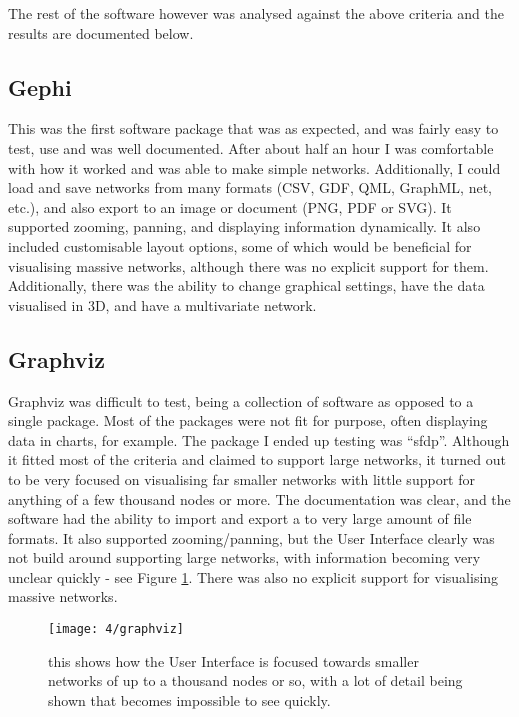 \documentclass[../dissertation.tex]{subfiles}
\begin{document}
The rest of the software however was analysed against the above criteria and the results are documented below.

\subsection{Gephi}

This was the first software package that was as expected, and was fairly easy to test, use and was well documented. After about half an hour I was comfortable with how it worked and was able to make simple networks. Additionally, I could load and save networks from many formats (CSV, GDF, QML, GraphML, net, etc.), and also export to an image or document (PNG, PDF or SVG). It supported zooming, panning, and displaying information dynamically. It also included customisable layout options, some of which would be beneficial for visualising massive networks, although there was no explicit support for them. Additionally, there was the ability to change graphical settings, have the data visualised in 3D, and have a multivariate network.

\subsection{Graphviz}

Graphviz was difficult to test, being a collection of software as opposed to a single package. Most of the packages were not fit for purpose, often displaying data in charts, for example. The package I ended up testing was ``sfdp''. Although it fitted most of the criteria and claimed to support large networks, it turned out to be very focused on visualising far smaller networks with little support for anything of a few thousand nodes or more. The documentation was clear, and the software had the ability to import and export a to very large amount of file formats. It also supported zooming/panning, but the User Interface clearly was not build around supporting large networks, with information becoming very unclear quickly - see Figure \ref{fig:graphviz}. There was also no explicit support for visualising massive networks.

\begin{figure}
    \centering
    \texttt{[image: 4/graphviz]}
    \caption{this shows how the User Interface is focused towards smaller networks of up to a thousand nodes or so, with a lot of detail being shown that becomes impossible to see quickly.}
    \label{fig:graphviz}
\end{figure}
\end{document}
